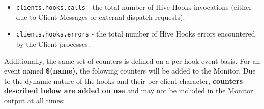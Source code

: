 \documentclass[a4paper]{article}
\begin{document}
\begin{itemize}
\item \texttt{clients.hooks.calls} - the total number of Hive Hooks invocations (either due to Client Messages or external dispatch requests).
\item \texttt{clients.hooks.errors} - the total number of Hive Hooks errors encountered by the Client processes.
\end{itemize}

\noindent
Additionally, the same set of counters is defined on a per-hook-event basis. For an event named \textbf{\$(name)}, the folowing counters will be added to the Monitor. Due to the dynamic nature of the hooks and their per-client character, \textbf{counters described below are added on use} and may not be included in the Monitor output at all times:
\end{document}
